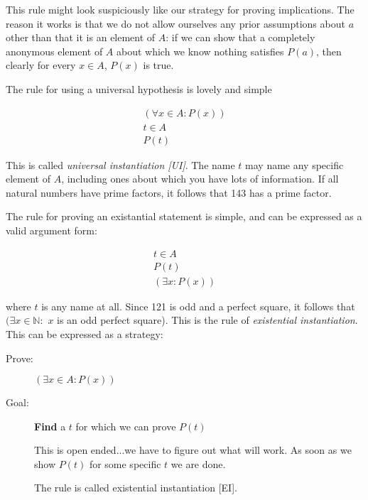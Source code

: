 \documentclass[12pt]{article}
\begin{document}
This rule might look suspiciously like our strategy for proving implications.  The reason it works is that we do not allow ourselves any prior assumptions about $a$ other than that it is an element of $A$:  if we can show that a completely anonymous element of $A$ about which we know nothing satisfies $P(a)$, then clearly for every $x\in A$, $P(x)$ is true.

The rule for using a universal hypothesis is lovely and simple

$$\begin{array}{c}

(\forall x \in A:P(x)) \\

t \in A \\ \hline

P(t)
\end{array}$$

This is called {\em universal instantiation [UI]\/}.  The name $t$ may name any specific element of $A$, including ones about which you have lots of information.  If all natural numbers have prime factors, it follows that 143 has a prime factor.

The rule for proving an existantial statement is simple, and can be expressed as a valid argument form:

$$\begin{array}{c}

t \in A \\

P(t) \\ \hline

(\exists x:P(x))
\end{array}$$

where $t$ is any name at all.  Since 121 is odd and a perfect square, it follows that $(\exists x \in {\mathbb N}:$  $x$ is an odd perfect square).  This is the rule of {\em existential instantiation\/}.
\newpage
This can be expressed as a strategy:

\begin{description}
\item[Prove:] $(\exists x \in A:P(x))$

\item[Goal:]  {\bf Find} a $t$ for which we can prove $P(t)$

This is open ended...we have to figure out what will work.  As soon as we show $P(t)$ for some specific $t$ we are done.

The rule is called existential instantiation [EI].

\end{description}
\end{document}
